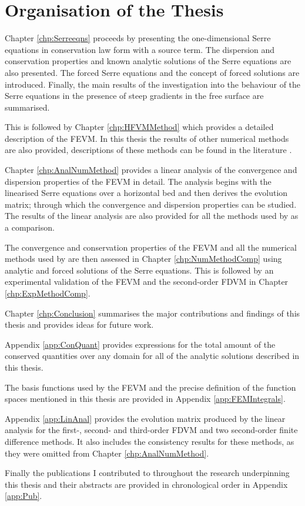 
\newpage

\section{Organisation of the Thesis}
Chapter \ref{chp:Serreeqns} proceeds by presenting the one-dimensional Serre equations in conservation law form with a source term. The dispersion and conservation properties and known analytic solutions of the Serre equations are also presented. The forced Serre equations and the concept of forced solutions are introduced. Finally, the main results of the investigation into the behaviour of the Serre equations in the presence of steep gradients in the free surface \cite{Pitt-2018-61} are summarised.

This is followed by Chapter \ref{chp:HFVMMethod} which provides a detailed description of the FEVM. In this thesis the results of other numerical methods are also provided, descriptions of these methods can be found in the literature \cite{Zoppou-etal-2017,Pitt-2018-61}. 

Chapter \ref{chp:AnalNumMethod} provides a linear analysis of the convergence and dispersion properties of the FEVM in detail. The analysis begins with the linearised Serre equations over a horizontal bed and then derives the evolution matrix; through which the convergence and dispersion properties can be studied. The results of the linear analysis are also provided for all the methods used by \citet{Pitt-2018-61} as a comparison.

The convergence and conservation properties of the FEVM and all the numerical methods used by \citet{Pitt-2018-61} are then assessed in Chapter \ref{chp:NumMethodComp} using analytic and forced solutions of the Serre equations. This is followed by an experimental validation of the FEVM and the second-order FDVM in Chapter \ref{chp:ExpMethodComp}.

Chapter \ref{chp:Conclusion} summarises the major contributions and findings of this thesis and provides ideas for future work.

Appendix \ref{app:ConQuant} provides expressions for the total amount of the conserved quantities over any domain for all of the analytic solutions described in this thesis. 

The basis functions used by the FEVM and the precise definition of the function spaces mentioned in this thesis are provided in Appendix \ref{app:FEMIntegrals}. 

Appendix \ref{app:LinAnal} provides the evolution matrix produced by the linear analysis for the first-, second- and third-order FDVM and two second-order finite difference methods. It also includes the consistency results for these methods, as they were omitted from Chapter \ref{chp:AnalNumMethod}.

Finally the publications I contributed to throughout the research underpinning this thesis and their abstracts are provided in chronological order in Appendix \ref{app:Pub}. 